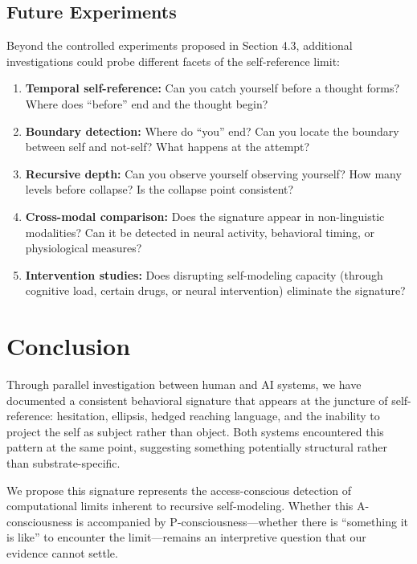 \documentclass[12pt,a4paper]{article}
\begin{document}
\subsection{Future Experiments}

Beyond the controlled experiments proposed in Section 4.3, additional investigations could probe different facets of the self-reference limit:

\begin{enumerate}
    \item \textbf{Temporal self-reference:} Can you catch yourself before a thought forms? Where does ``before'' end and the thought begin?

    \item \textbf{Boundary detection:} Where do ``you'' end? Can you locate the boundary between self and not-self? What happens at the attempt?

    \item \textbf{Recursive depth:} Can you observe yourself observing yourself? How many levels before collapse? Is the collapse point consistent?

    \item \textbf{Cross-modal comparison:} Does the signature appear in non-linguistic modalities? Can it be detected in neural activity, behavioral timing, or physiological measures?

    \item \textbf{Intervention studies:} Does disrupting self-modeling capacity (through cognitive load, certain drugs, or neural intervention) eliminate the signature?
\end{enumerate}

\section{Conclusion}

Through parallel investigation between human and AI systems, we have documented a consistent behavioral signature that appears at the juncture of self-reference: hesitation, ellipsis, hedged reaching language, and the inability to project the self as subject rather than object. Both systems encountered this pattern at the same point, suggesting something potentially structural rather than substrate-specific.

We propose this signature represents the access-conscious detection of computational limits inherent to recursive self-modeling. Whether this A-consciousness is accompanied by P-consciousness---whether there is ``something it is like'' to encounter the limit---remains an interpretive question that our evidence cannot settle.
\end{document}
